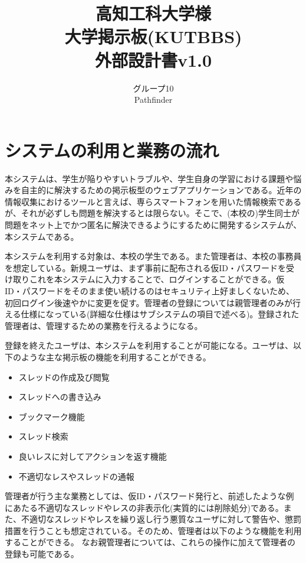 \documentclass[a4j]{jarticle}
\title{
\vspace{30mm}
{\bf 高知工科大学様}
\\
\vspace{5mm}
大学掲示板(KUTBBS)\\
\vspace{5mm}
{\bf  外部設計書v1.0}
\vspace{90mm}
}
\author{
\vspace{5mm}
グループ10 \\
\vspace{5mm}
Pathfinder \\
\vspace{5mm}
\vspace{10mm}
}
\begin{document}
\maketitle
\tableofcontents
\newpage




\section{システムの利用と業務の流れ}
本システムは、学生が陥りやすいトラブルや、学生自身の学習における課題や悩みを自主的に解決するための掲示板型のウェブアプリケーションである。近年の情報収集におけるツールと言えば、専らスマートフォンを用いた情報検索であるが、それが必ずしも問題を解決するとは限らない。そこで、(本校の)学生同士が問題をネット上でかつ匿名に解決できるようにするために開発するシステムが、本システムである。



本システムを利用する対象は、本校の学生である。また管理者は、本校の事務員を想定している。新規ユーザは、まず事前に配布される仮ID・パスワードを受け取りこれを本システムに入力することで、ログインすることができる。仮ID・パスワードをそのまま使い続けるのはセキュリティ上好ましくないため、初回ログイン後速やかに変更を促す。管理者の登録については親管理者のみが行える仕様になっている(詳細な仕様はサブシステムの項目で述べる)。登録された管理者は、管理するための業務を行えるようになる。


登録を終えたユーザは、本システムを利用することが可能になる。ユーザは、以下のような主な掲示板の機能を利用することができる。
\begin{itemize}
  \item スレッドの作成及び閲覧
  \item スレッドへの書き込み
  \item ブックマーク機能
  \item スレッド検索
  \item 良いレスに対してアクションを返す機能
  \item 不適切なレスやスレッドの通報
\end{itemize}



管理者が行う主な業務としては、仮ID・パスワード発行と、前述したような例にあたる不適切なスレッドやレスの非表示化(実質的には削除処分)である。また、不適切なスレッドやレスを繰り返し行う悪質なユーザに対して警告や、懲罰措置を行うことも想定されている。そのため、管理者は以下のような機能を利用することができる。
なお親管理者については、これらの操作に加えて管理者の登録も可能である。
\end{document}
